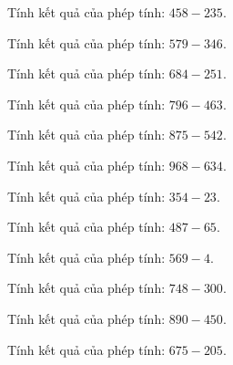 \begin{ex}
Tính kết quả của phép tính: $458 - 235$.
\end{ex}

\begin{ex}
Tính kết quả của phép tính: $579 - 346$.
\end{ex}

\begin{ex}
Tính kết quả của phép tính: $684 - 251$.
\end{ex}

\begin{ex}
Tính kết quả của phép tính: $796 - 463$.
\end{ex}

\begin{ex}
Tính kết quả của phép tính: $875 - 542$.
\end{ex}

\begin{ex}
Tính kết quả của phép tính: $968 - 634$.
\end{ex}

\begin{ex}
Tính kết quả của phép tính: $354 - 23$.
\end{ex}

\begin{ex}
Tính kết quả của phép tính: $487 - 65$.
\end{ex}

\begin{ex}
Tính kết quả của phép tính: $569 - 4$.
\end{ex}

\begin{ex}
Tính kết quả của phép tính: $748 - 300$.
\end{ex}

\begin{ex}
Tính kết quả của phép tính: $890 - 450$.
\end{ex}

\begin{ex}
Tính kết quả của phép tính: $675 - 205$.
\end{ex}

